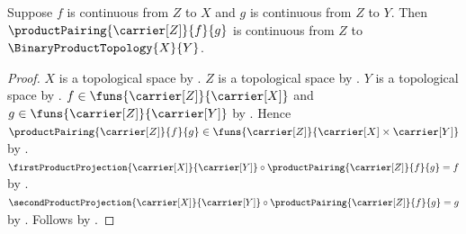 \begin{theorem}\label{continuous_product_pairing}
    Suppose $f$ is continuous from $Z$ to $X$ and
        $g$ is continuous from $Z$ to $Y$.
    Then $\productPairing{\carrier[Z]}{f}{g}$ is continuous from $Z$ to
        $\BinaryProductTopology{X}{Y}$.
\end{theorem}
\begin{proof}
    $X$ is a topological space by .
    $Z$ is a topological space by .
    $Y$ is a topological space by .
    $f\in\funs{\carrier[Z]}{\carrier[X]}$ and
        $g\in\funs{\carrier[Z]}{\carrier[Y]}$ by
        .
    Hence $\productPairing{\carrier[Z]}{f}{g}\in
        \funs{\carrier[Z]}{\carrier[X]\times\carrier[Y]}$ by
        .
    $\firstProductProjection{\carrier[X]}{\carrier[Y]}\circ
        \productPairing{\carrier[Z]}{f}{g}=f$ by
        .
    $\secondProductProjection{\carrier[X]}{\carrier[Y]}\circ
        \productPairing{\carrier[Z]}{f}{g}=g$ by
        .
    Follows by .
\end{proof}
